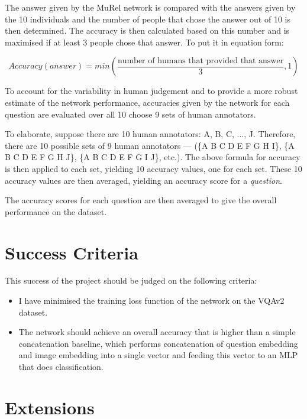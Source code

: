 \documentclass[12pt]{article}
\begin{document}
The answer given by the MuRel network is compared with the answers given by the 10 individuals and the number of people that chose the answer out of 10 is then determined. The accuracy is then calculated based on this number and is maximised if at least 3 people chose that answer. To put it in equation form:


\[Accuracy(answer) = min(\frac{\textrm{number of humans that provided that answer}}{3}, 1)\]	

To account for the variability in human judgement and to provide a more robust estimate of the network performance, accuracies given by the network for each question are evaluated over all 10 choose 9 sets of human annotators. 

To elaborate, suppose there are 10 human annotators: A, B, C, ..., J. Therefore, there are 10 possible sets of 9 human annotators --- (\{A B C D E F G H I\}, \{A B C D E F G H J\}, \{A B C D E F G I J\}, etc.). The above formula for accuracy is then applied to each set, yielding 10 accuracy values, one for each set. These 10 accuracy values are then averaged, yielding an accuracy score for a \emph{question}.

The accuracy scores for each question are then averaged to give the overall performance on the dataset.

\section*{Success Criteria}

This success of the project should be judged on the following criteria:
\begin{itemize}
	\item I have minimised the training loss function of the network on the VQAv2 dataset.
	\item The network should achieve an overall accuracy that is higher than a simple concatenation baseline, which performs concatenation of question embedding and image embedding into a single vector and feeding this vector to an MLP that does classification.
\end{itemize}

\section*{Extensions}
\end{document}
